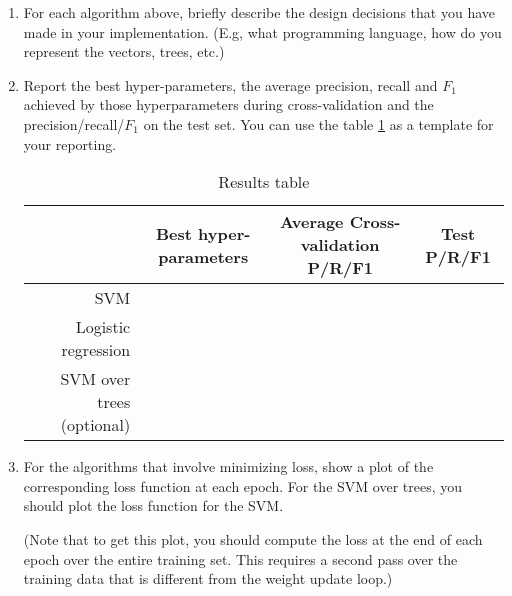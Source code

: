 \begin{enumerate}
\item For each algorithm above, briefly describe the design decisions that you
  have made in your implementation. (E.g, what programming language, how do you
  represent the vectors, trees, etc.)


\item Report the best hyper-parameters, the average precision,
  recall and $F_1$ achieved by those hyperparameters during
  cross-validation and the precision/recall/$F_1$ on the test
  set. You can use the table \ref{tb} as a template for your reporting.

  \begin{table}[]
    \centering
    \scriptsize
    \begin{tabular}{rccc}
      \toprule 
                          & Best hyper-parameters & Average Cross-validation P/R/F1 & Test P/R/F1 \\\midrule
      SVM                 &                       &                                 &             \\
      Logistic regression &                       &                                 &             \\
      SVM over trees (optional)      &                       &                                 &             \\
      \bottomrule
    \end{tabular}
    \caption{Results table}\label{tb}
  \end{table}

  
\item For the algorithms that involve minimizing loss, show a plot of the
  corresponding loss function at each epoch. For the SVM over trees, you should
  plot the loss function for the SVM.

  (Note that to get this plot, you should compute the loss at the end of each
  epoch over the entire training set. This requires a second pass over the
  training data that is different from the weight update loop.)

\end{enumerate}

